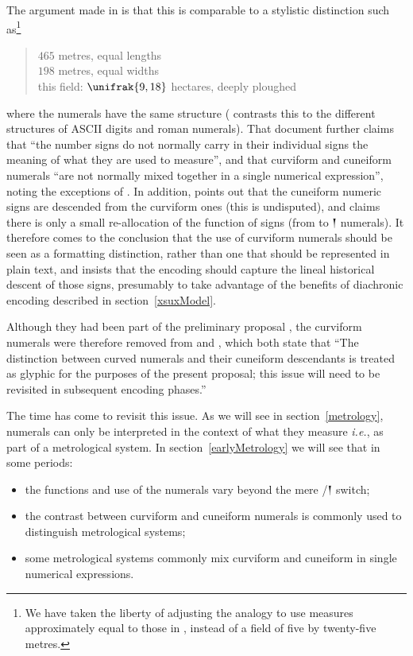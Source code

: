 \documentclass[10pt, a4paper, twoside]{article}
\newcommand\oneAšC{{\proposalfont\symbol{"12550}}} %
\newcommand{\idest}{\emph{i.e.}}
\begin{document}
The argument made in \cite[4]{L2/04-099} is that this is comparable to a stylistic distinction such as\footnote{We
have taken the liberty of adjusting the analogy to use measures approximately equal to those in \cite{P020054},
instead of a field of five by twenty-five metres.}
\begin{quote}
$465$ metres, equal lengths\\
$198$ metres, equal widths\\
this field: $\unifrak{9,18}$ hectares, deeply ploughed
\end{quote}
where the numerals have the same structure (\cite{L2/04-099} contrasts this to the different structures
of ASCII digits and roman numerals).
That document further claims that ``the number signs do not normally carry in their individual signs the
meaning of what they are used to measure'', and that curviform and cuneiform numerals ``are not normally mixed together
in a single numerical expression'', noting the exceptions of \cites{P232278}{P232280}.
In addition, \cite[4]{L2/04-099} points out that the cuneiform numeric signs are descended from
the curviform ones (this is undisputed),
and claims there is only a small re-allocation of the function of signs
(from \oneAšC{} to {\xsuxfont 𒁹} numerals).
It therefore comes to the conclusion that the use of curviform
numerals should be seen as a formatting distinction,
rather than one that should be represented in plain text,
and insists that the encoding should capture the lineal
historical descent of those signs, presumably to take
advantage of the benefits of diachronic encoding described
in section~\ref{xsuxModel}.

Although they had been part of the preliminary proposal \cite{L2/03-393R},
the curviform numerals were therefore removed from \cite{L2/04-036} and \cite{L2/04-189},
which both state that ``The distinction between curved numerals and their cuneiform descendants
is treated as glyphic for the purposes of the present proposal;
this issue will need to be revisited in subsequent encoding phases.''

The time has come to revisit this issue.
As we will see in section~\ref{metrology},
numerals can only be interpreted in the context of what they measure \idest,
as part of a metrological system.
In section~\ref{earlyMetrology} we will see that in some periods:
\begin{itemize}[nosep]
  \item the functions and use of the numerals vary beyond the mere \oneAšC/{\xsuxfont 𒁹} switch;
  \item the contrast between curviform and cuneiform numerals is commonly used to distinguish metrological systems;
  \item some metrological systems commonly mix curviform and cuneiform in single numerical expressions.
\end{itemize}
\end{document}
